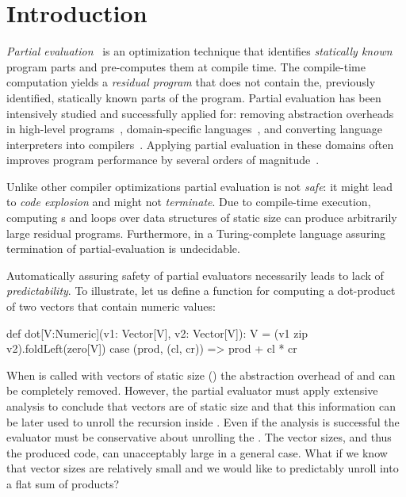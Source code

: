 \section{Introduction}
\label{sct:introduction}

\emph{Partial evaluation}~\cite{jones1993partial} is an optimization technique
that identifies \emph{statically known} program parts and pre-computes them at
compile time. The compile-time computation yields a \emph{residual program} that
does not contain the, previously identified, statically known parts of the
program. Partial evaluation has been intensively studied and successfully
applied for: removing abstraction overheads in high-level
programs~\cite{carette2005multi,rompf2012lightweight}, domain-specific
languages~\cite{brady2010,jonnalagedda2014staged}, and converting language
interpreters into compilers~\cite{futamura1999partial,lancet,wurthinger2013one}.
Applying partial evaluation in these domains often improves program performance
by several orders of magnitude~\cite{shali2011Hybrid,brady2010}.

Unlike other compiler optimizations partial evaluation is not \emph{safe}: it
 might lead to \emph{code explosion} and might not \emph{terminate}. Due to
 compile-time execution,  computing s and loops over data structures
 of static size can produce arbitrarily large residual programs. Furthermore, in a
 Turing-complete language assuring termination of partial-evaluation is undecidable. 

Automatically assuring safety of partial evaluators necessarily leads to
 lack of \emph{predictability}. To illustrate, let us define a function
  for computing a dot-product of two vectors that contain numeric values\footnotemark[1]:\begin{lstparagraph}
  def dot[V:Numeric](v1: Vector[V], v2: Vector[V]): V =
    (v1 zip v2).foldLeft(zero[V]){ case (prod, (cl, cr)) =>
      prod + cl * cr
    }
\end{lstparagraph}

When  is called with vectors of static size (\eg {}) the abstraction overhead of  and 
 can be completely removed. However, the partial evaluator must apply extensive
 analysis to conclude that vectors are of static size and that this information
 can be later used to unroll the recursion inside . Even if the analysis is
 successful the evaluator must be conservative about unrolling the
 . The vector sizes, and thus the produced code, can unacceptably
 large in a general case. What if we know that vector sizes are relatively small
 and we would like to predictably unroll  into a flat sum of products?


